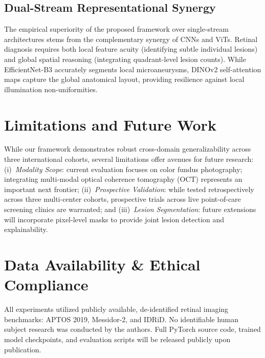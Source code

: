 \documentclass[conference]{IEEEtran}
\begin{document}
\subsection{Dual-Stream Representational Synergy}
The empirical superiority of the proposed framework over single-stream architectures stems from the complementary synergy of CNNs and ViTs. Retinal diagnosis requires both local feature acuity (identifying subtle individual lesions) and global spatial reasoning (integrating quadrant-level lesion counts). While EfficientNet-B3 accurately segments local microaneurysms, DINOv2 self-attention maps capture the global anatomical layout, providing resilience against local illumination non-uniformities.

\section{Limitations and Future Work}
While our framework demonstrates robust cross-domain generalizability across three international cohorts, several limitations offer avenues for future research: (i)~\emph{Modality Scope}: current evaluation focuses on color fundus photography; integrating multi-modal optical coherence tomography (OCT) represents an important next frontier; (ii)~\emph{Prospective Validation}: while tested retrospectively across three multi-center cohorts, prospective trials across live point-of-care screening clinics are warranted; and (iii)~\emph{Lesion Segmentation}: future extensions will incorporate pixel-level masks to provide joint lesion detection and explainability.

\section{Data Availability \& Ethical Compliance}
All experiments utilized publicly available, de-identified retinal imaging benchmarks: APTOS 2019, Messidor-2, and IDRiD. No identifiable human subject research was conducted by the authors. Full PyTorch source code, trained model checkpoints, and evaluation scripts will be released publicly upon publication.
\end{document}
